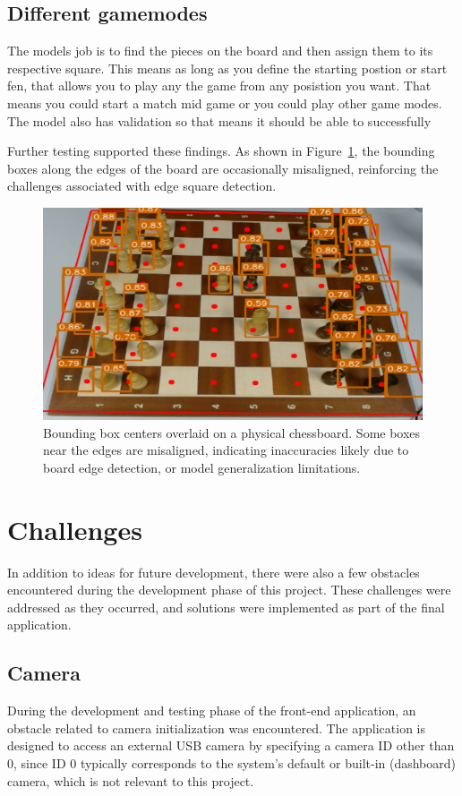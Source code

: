 \subsection{Different gamemodes}

The models job is to find the pieces on the board and then assign them to its respective square. This means as long as you define the starting postion or start fen, that allows you to play any the game from any posistion you want. That means you could start a match mid game or you could play other game modes. The model also has validation so that means it should be able to successfully



Further testing supported these findings. As shown in Figure~\ref{fig:bbox-centers-incorrect}, the bounding boxes along the edges of the board are occasionally misaligned, reinforcing the challenges associated with edge square detection.

\begin{figure}[h!]
    \centering
    \includegraphics[width=0.75\linewidth]{figures/discussion/bbox-centers-incorrect.png}
    \caption{Bounding box centers overlaid on a physical chessboard. Some boxes near the edges are misaligned, indicating inaccuracies likely due to board edge detection, or model generalization limitations.}
    \label{fig:bbox-centers-incorrect}
\end{figure}

\section{Challenges}
In addition to ideas for future development, there were also a few obstacles encountered during the development phase of this project. These challenges were addressed as they occurred, and solutions were implemented as part of the final application.

\subsection{Camera}
During the development and testing phase of the front-end application, an obstacle related to camera initialization was encountered. The application is designed to access an external USB camera by specifying a camera ID other than 0, since ID 0 typically corresponds to the system's default or built-in (dashboard) camera, which is not relevant to this project.\\

